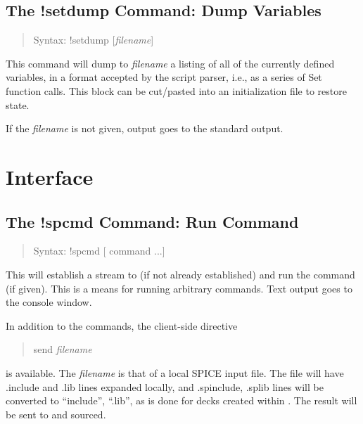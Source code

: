 \subsection{The {\cb !setdump} Command: Dump Variables}
\begin{quote}
Syntax: {\vt !setdump} [{\it filename\/}]
\end{quote}
This command will dump to {\it filename} a listing of all of the
currently defined variables, in a format accepted by the script
parser, i.e., as a series of {\vt Set} function calls.  This block can
be cut/pasted into an initialization file to restore state.

If the {\it filename} is not given, output goes to the standard
output.


\section{{\WRspice} Interface}

\subsection{The {\cb !spcmd} Command: Run {\WRspice} Command}
\begin{quote}
Syntax: {\vt !spcmd} [{\WRspice} command ...]
\end{quote}
This will establish a stream to {\WRspice} (if not already
established) and run the command (if given).  This is a means for
running arbitrary {\WRspice} commands.  Text output goes to the
console window.

In addition to the {\WRspice} commands, the client-side directive
\begin{quote}
{\vt send} {\it filename}
\end{quote}
is available.  The {\it filename} is that of a local SPICE input file. 
The file will have {\vt .include} and {\vt .lib} lines expanded
locally, and {\vt .spinclude}, {\vt .splib} lines will be converted to
``{\vt include}'', ``{\vt .lib}'', as is done for decks created within
{\Xic}.  The result will be sent to {\WRspice} and sourced.

